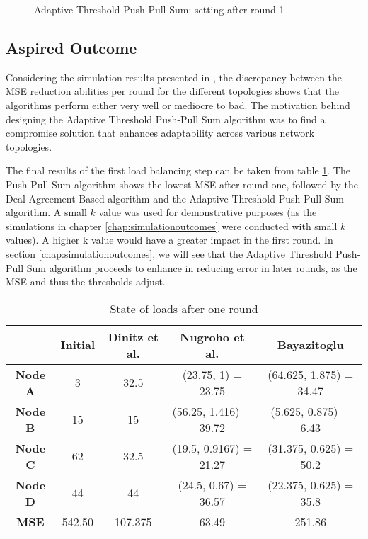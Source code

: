\begin{figure}
    \centering
    \scalebox{0.75}{}
    \caption{Adaptive Threshold Push-Pull Sum: setting after round 1}
    \label{fig:ATPPSExampleResult}
\end{figure}
\subsection{Aspired Outcome}\label{subsec:aspiredOutcomeAdaptiveThresholdPPS}
Considering the simulation results presented in \cite{Bayazitoglu}, the discrepancy between the MSE reduction abilities per round for the different topologies shows that the algorithms perform either very well or mediocre to bad. The motivation behind designing the Adaptive Threshold Push-Pull Sum algorithm was to find a compromise solution that enhances adaptability across various network topologies.

The final results of the first load balancing step can be taken from table \ref{tab:overviewExamples}. The Push-Pull Sum algorithm shows the lowest MSE after round one, followed by the Deal-Agreement-Based algorithm and the Adaptive Threshold Push-Pull Sum algorithm. A small $k$ value was used for demonstrative purposes (as the simulations in chapter \ref{chap:simulationoutcomes} were conducted with small $k$ values). A higher k value would have a greater impact in the first round. In section \ref{chap:simulationoutcomes}, we will see that the Adaptive Threshold Push-Pull Sum algorithm proceeds to enhance in reducing error in later rounds, as the MSE and thus the thresholds adjust.

\begin{table}
\centering
\begin{tabular}{|c|c|c|c|c|}
\hline
 & \textbf{Initial} & \textbf{Dinitz et al.} & \textbf{Nugroho et al.} & \textbf{Bayazitoglu} \\ \hline
\textbf{Node A}  & 3      & 32.5    & (23.75, 1) = 23.75     & (64.625, 1.875) = 34.47 \\ \hline
\textbf{Node B}  & 15     & 15      & (56.25, 1.416) = 39.72 & (5.625, 0.875) = 6.43   \\ \hline
\textbf{Node C}  & 62     & 32.5    & (19.5, 0.9167) = 21.27 & (31.375, 0.625) = 50.2  \\ \hline
\textbf{Node D}  & 44     & 44      & (24.5, 0.67) = 36.57   & (22.375, 0.625) = 35.8  \\ \hline
\textbf{MSE} & 542.50 & 107.375 & 63.49                  & 251.86                  \\ \hline
\end{tabular}
\caption{State of loads after one round}
\label{tab:overviewExamples}
\end{table}